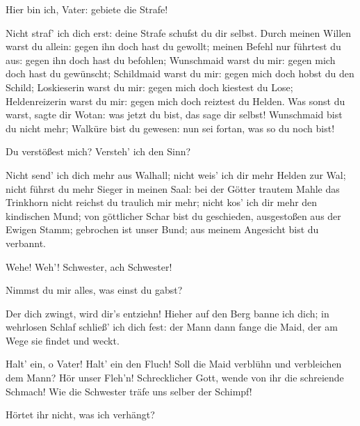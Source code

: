 \begin{drama}
Hier bin ich, Vater: gebiete die Strafe!
 

\Wotanspeaks
Nicht straf' ich dich erst:
deine Strafe schufst du dir selbst.
Durch meinen Willen warst du allein:
gegen ihn doch hast du gewollt;
meinen Befehl nur führtest du aus:
gegen ihn doch hast du befohlen;
Wunschmaid warst du mir:
gegen mich doch hast du gewünscht;
Schildmaid warst du mir:
gegen mich doch hobst du den Schild;
Loskieserin warst du mir:
gegen mich doch kiestest du Lose;
Heldenreizerin warst du mir:
gegen mich doch reiztest du Helden.
Was sonst du warst, sagte dir Wotan:
was jetzt du bist, das sage dir selbst!
Wunschmaid bist du nicht mehr;
Walküre bist du gewesen:
nun sei fortan, was so du noch bist!
 

\Brunnhildespeaks


Du verstößest mich? Versteh' ich den Sinn?
 

\Wotanspeaks
Nicht send' ich dich mehr aus Walhall;
nicht weis' ich dir mehr Helden zur Wal;
nicht führst du mehr Sieger
in meinen Saal:
bei der Götter trautem Mahle
das Trinkhorn nicht reichst du traulich mir mehr;
nicht kos' ich dir mehr den kindischen Mund;
von göttlicher Schar bist du geschieden,
ausgestoßen aus der Ewigen Stamm;
gebrochen ist unser Bund;
aus meinem Angesicht bist du verbannt.
 



Wehe! Weh'!
Schwester, ach Schwester!
 

\Brunnhildespeaks
Nimmst du mir alles, was einst du gabst?
 

\Wotanspeaks
Der dich zwingt, wird dir's entziehn!
Hieher auf den Berg banne ich dich;
in wehrlosen Schlaf schließ' ich dich fest:
der Mann dann fange die Maid,
der am Wege sie findet und weckt.
 



Halt' ein, o Vater! Halt' ein den Fluch!
Soll die Maid verblühn und verbleichen dem Mann?
Hör unser Fleh'n! Schrecklicher Gott,
wende von ihr die schreiende Schmach!
Wie die Schwester träfe uns selber der Schimpf!
 

\Wotanspeaks
Hörtet ihr nicht, was ich verhängt?
 


\end{drama}
